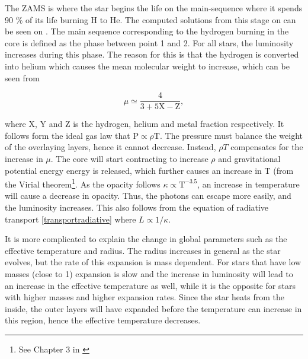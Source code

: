 The ZAMS is where the star begins the life on the main-sequence where it spends 90 \% of its life burning H to He. The computed solutions from this stage on can be seen on . The main sequence corresponding to the hydrogen burning in the core is defined as the phase between point 1 and 2. For all stars, the luminosity increases during this phase. The reason for this is that the hydrogen is converted into helium which causes the mean molecular weight to increase, which can be seen from

\begin{equation}
\label{meanmol}
\mu \simeq \frac{4}{3+5\text{X}-\text{Z}},
\end{equation}


\noindent where X, Y and Z is the hydrogen, helium and metal fraction respectively. It follows form the ideal gas law that $\text{P} \propto \rho \text{T}$. The pressure must balance the weight of the overlaying layers, hence it cannot decrease. Instead, $\rho T$ compensates for the increase in $\mu$. The core will start contracting to increase $\rho$ and gravitational potential energy energy is released, which further causes an increase in T (from the Virial theorem\footnote{See Chapter 3 in \citet{kippenhahn1990stellar}}. As the opacity follows $\kappa \propto \text{T}^{-3.5}$, an increase in temperature will cause a decrease in opacity. Thus, the photons can escape more easily, and the luminosity increases. This also follows from the equation of radiative transport \eqref{transportradiative} where $L\propto 1/\kappa$.

It is more complicated to explain the change in global parameters such as the effective temperature and radius. The radius increases in general as the star evolves, but the rate of this expansion is mass dependent. For stars that have low masses (close to 1\msun ) expansion is slow and the increase in luminosity will lead to an increase in the effective temperature as well, while it is the opposite for stars with higher masses and higher expansion rates. Since the star heats from the inside, the outer layers will have expanded before the temperature can increase in this region, hence the effective temperature decreases. 

